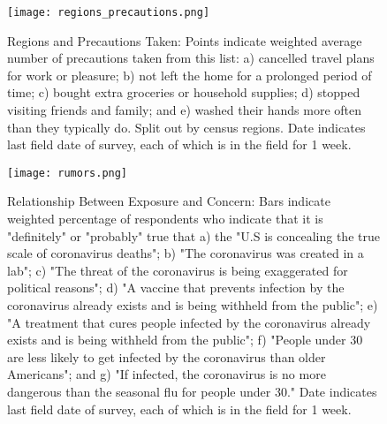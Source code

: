\documentclass[landscape]{article}
\begin{document}
\begin{figure}
\begin{center}
\texttt{[image: regions\_precautions.png]}
\end{center}
\caption{Regions and Precautions Taken: Points indicate weighted average number of precautions taken from this list: a) cancelled travel plans for work or pleasure; b) not left the home for a prolonged period of time; c) bought extra groceries or household supplies; d) stopped visiting friends and family; and e) washed their hands more often than they typically do. Split out by census regions. Date indicates last field date of survey, each of which is in the field for 1 week.}
\end{figure}







\begin{figure}
\begin{center}
\texttt{[image: rumors.png]}
\end{center}
\caption{Relationship Between Exposure and Concern: Bars indicate weighted percentage of respondents who indicate that it is "definitely" or "probably" true that a) the "U.S is concealing the true scale of coronavirus deaths"; b) "The coronavirus was created in a lab"; c) "The threat of the coronavirus is being exaggerated for political reasons"; d) "A vaccine that prevents infection by the coronavirus already exists and is being withheld from the public"; e) "A treatment that cures people infected by the coronavirus already exists and is being withheld from the public"; f) "People under 30 are less likely to get infected by the coronavirus than older Americans"; and g) "If infected, the coronavirus is no more dangerous than the seasonal flu for people under 30." Date indicates last field date of survey, each of which is in the field for 1 week.}
\end{figure}
\end{document}
